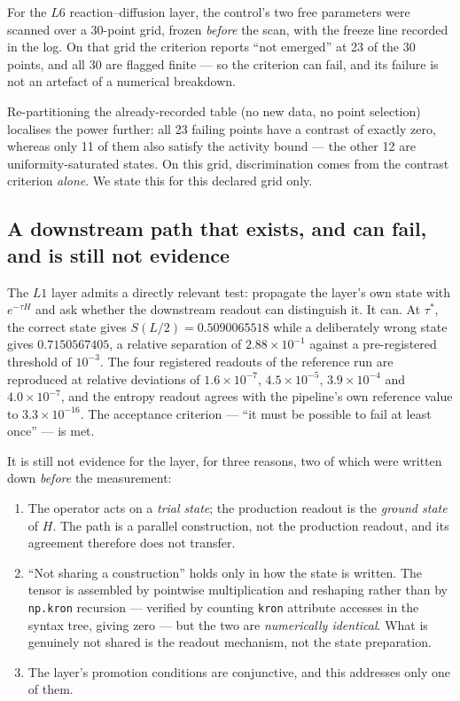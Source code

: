 \documentclass[11pt,a4paper]{article}
\newcommand{\code}[1]{\texttt{\small #1}}
\begin{document}
For the $L6$ reaction--diffusion layer, the control's two free parameters were
scanned over a $30$-point grid, frozen \emph{before} the scan, with the freeze
line recorded in the log. On that grid the criterion reports ``not emerged'' at
23 of the 30 points, and all 30 are flagged finite --- so the criterion can fail,
and its failure is not an artefact of a numerical breakdown.

Re-partitioning the already-recorded table (no new data, no point selection)
localises the power further: all 23 failing points have a contrast of exactly
zero, whereas only 11 of them also satisfy the activity bound --- the other 12
are uniformity-saturated states. On this grid, discrimination comes from the
contrast criterion \emph{alone}. We state this for this declared grid only.

\subsection{A downstream path that exists, and can fail, and is still not
evidence}
\label{sec:downstream}

The $L1$ layer admits a directly relevant test: propagate the layer's own state
with $e^{-\tau H}$ and ask whether the downstream readout can distinguish it. It
can. At $\tau^\ast$, the correct state gives $S(L/2) = 0.5090065518$ while a
deliberately wrong state gives $0.7150567405$, a relative separation of
$2.88\times10^{-1}$ against a pre-registered threshold of $10^{-3}$. The four
registered readouts of the reference run are reproduced at relative deviations
of $1.6\times10^{-7}$, $4.5\times10^{-5}$, $3.9\times10^{-4}$ and
$4.0\times10^{-7}$, and the entropy readout agrees with the pipeline's own
reference value to $3.3\times10^{-16}$. The acceptance
criterion --- ``it must be possible to fail at least once'' --- is met.

It is still not evidence for the layer, for three reasons, two of which were
written down \emph{before} the measurement:

\begin{enumerate}[leftmargin=1.4em,itemsep=2pt]
  \item The operator acts on a \emph{trial state}; the production readout is the
        \emph{ground state} of $H$. The path is a parallel construction, not the
        production readout, and its agreement therefore does not transfer.
  \item ``Not sharing a construction'' holds only in how the state is written.
        The tensor is assembled by pointwise multiplication and reshaping rather
        than by \code{np.kron} recursion --- verified by counting \code{kron}
        attribute accesses in the syntax tree, giving zero --- but the two are
        \emph{numerically identical}. What is genuinely not shared is the
        readout mechanism, not the state preparation.
  \item The layer's promotion conditions are conjunctive, and this addresses
        only one of them.
\end{enumerate}
\end{document}
